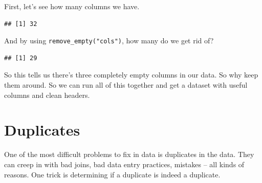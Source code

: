 \documentclass[]{book}
\newenvironment{Shaded}{\begin{snugshade}}{\end{snugshade}}
\newcommand{\KeywordTok}[1]{\textcolor[rgb]{0.13,0.29,0.53}{\textbf{#1}}}
\newcommand{\NormalTok}[1]{#1}
\newcommand{\OperatorTok}[1]{\textcolor[rgb]{0.81,0.36,0.00}{\textbf{#1}}}
\newcommand{\StringTok}[1]{\textcolor[rgb]{0.31,0.60,0.02}{#1}}
\begin{document}
First, let's see how many columns we have.

\begin{Shaded}
\end{Shaded}

\begin{verbatim}
## [1] 32
\end{verbatim}

And by using \texttt{remove\_empty("cols")}, how many do we get rid of?

\begin{Shaded}
\end{Shaded}

\begin{verbatim}
## [1] 29
\end{verbatim}

So this tells us there's three completely empty columns in our data. So why keep them around.
So we can run all of this together and get a dataset with useful columns and clean headers.

\begin{Shaded}
\end{Shaded}

\hypertarget{duplicates}{%
\section{Duplicates}\label{duplicates}}

One of the most difficult problems to fix in data is duplicates in the data. They can creep in with bad joins, bad data entry practices, mistakes -- all kinds of reasons. One trick is determining if a duplicate is indeed a duplicate.
\end{document}

